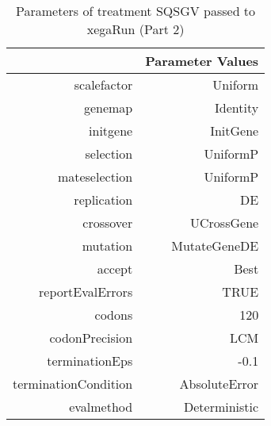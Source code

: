 \begin{table}[ht]
\centering
\begin{tabular}{rr}
  \hline
 & Parameter Values \\ 
  \hline
scalefactor & Uniform \\ 
  genemap & Identity \\ 
  initgene & InitGene \\ 
  selection & UniformP \\ 
  mateselection & UniformP \\ 
  replication & DE \\ 
  crossover & UCrossGene \\ 
  mutation & MutateGeneDE \\ 
  accept & Best \\ 
  reportEvalErrors & TRUE \\ 
  codons & 120 \\ 
  codonPrecision & LCM \\ 
  terminationEps & -0.1 \\ 
  terminationCondition & AbsoluteError \\ 
  evalmethod & Deterministic \\ 
   \hline
\end{tabular}
\caption{ Parameters of treatment SQSGV passed to xegaRun
 (Part 2)} 
\end{table}
